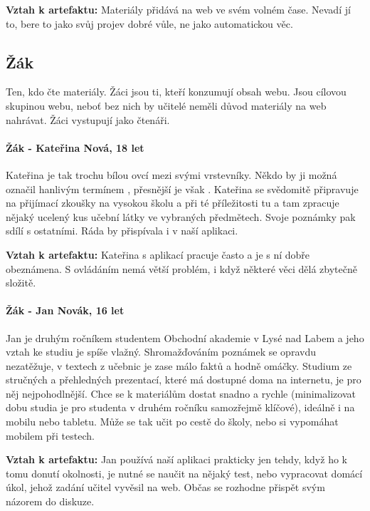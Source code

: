 \documentclass[thesis=B,czech]{FITthesis}[2012/06/26]
\begin{document}
\textbf{Vztah k artefaktu:} Materiály přidává na web ve svém volném čase. Nevadí jí to, bere to jako svůj projev dobré vůle, ne jako automatickou věc.

\subsection{Žák}

Ten, kdo čte materiály. Žáci jsou ti, kteří konzumují obsah webu. Jsou cílovou skupinou webu, neboť bez nich by učitelé neměli důvod materiály na web nahrávat. Žáci vystupují jako čtenáři.

\paragraph{Žák - Kateřina Nová, 18 let}
Kateřina je tak trochu bílou ovcí mezi svými vrstevníky. Někdo by ji možná označil hanlivým termínem , přesnější je však . Kateřina se svědomitě připravuje na přijímací zkoušky na vysokou školu a při té příležitosti tu a tam zpracuje nějaký ucelený kus učební látky ve vybraných předmětech. Svoje poznámky pak sdílí s ostatními. Ráda by přispívala i v naší aplikaci.

\textbf{Vztah k artefaktu:} Kateřina s aplikací pracuje často a je s ní dobře obeznámena. S ovládáním nemá větší problém, i když některé věci dělá zbytečně složitě.

\paragraph{Žák - Jan Novák, 16 let}
Jan je druhým ročníkem studentem Obchodní akademie v Lysé nad Labem a jeho vztah ke studiu je spíše vlažný. Shromažďováním poznámek se opravdu nezatěžuje, v textech z učebnic je zase málo faktů a hodně omáčky. Studium ze stručných a přehledných prezentací, které má dostupné doma na internetu, je pro něj nejpohodlnější. Chce se k materiálům dostat snadno a rychle (minimalizovat dobu studia je pro studenta v druhém ročníku samozřejmě klíčové), ideálně i na mobilu nebo tabletu. Může se tak učit po cestě do školy, nebo si vypomáhat mobilem při testech.

\textbf{Vztah k artefaktu: }Jan používá naší aplikaci prakticky jen tehdy, když ho k tomu donutí okolnosti, je nutné se naučit na nějaký test, nebo vypracovat domácí úkol, jehož zadání učitel vyvěsil na web. Občas se rozhodne přispět svým názorem do diskuze.
\end{document}
